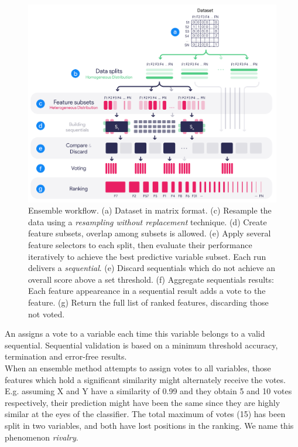 \begin{figure}[!htpb]
    \centering
    \includegraphics[width=\linewidth]{Minor Thesis/figures/diagrams/Ensemble.png}
    \caption{Ensemble workflow. (a) Dataset in matrix format. (c) Resample the data using a \emph{resampling without replacement} technique. (d) Create feature subsets, overlap among subsets is allowed. (e) Apply several feature selectors to each split, then evaluate their performance iteratively to achieve the best predictive variable subset. Each run delivers a \emph{sequential}. (e) Discard sequentials which do not achieve an overall score above a set threshold. (f) Aggregate sequentials results: Each feature appeareance in a sequential result adds a vote to the feature. (g) Return the full list of ranked features, discarding those not voted.}
    \label{fig:ensemble-diagram}
\end{figure}
An  assigns a vote to a variable each time this variable belongs to a valid sequential. Sequential validation is based on a minimum threshold accuracy, termination and error-free results.
\\

When an ensemble method attempts to assign votes to all variables, those features which hold a significant similarity might alternately receive the votes. E.g. assuming X and Y have a similarity of 0.99 and they obtain 5 and 10 votes respectively, their prediction might have been the same since they are highly similar at the eyes of the classifier. The total maximum of votes (15) has been split in two variables, and both have lost positions in the ranking. We name this phenomenon \emph{rivalry}.

